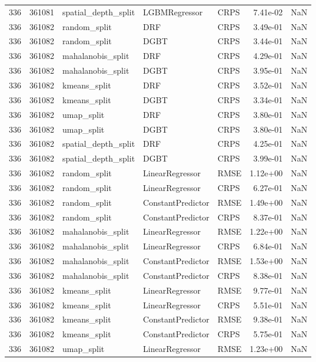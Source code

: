 \begin{tabular}{rrlllrr}
336 & 361081 & spatial\_depth\_split & LGBMRegressor & CRPS & 7.41e-02 & NaN \\
336 & 361082 & random\_split & DRF & CRPS & 3.49e-01 & NaN \\
336 & 361082 & random\_split & DGBT & CRPS & 3.44e-01 & NaN \\
336 & 361082 & mahalanobis\_split & DRF & CRPS & 4.29e-01 & NaN \\
336 & 361082 & mahalanobis\_split & DGBT & CRPS & 3.95e-01 & NaN \\
336 & 361082 & kmeans\_split & DRF & CRPS & 3.52e-01 & NaN \\
336 & 361082 & kmeans\_split & DGBT & CRPS & 3.34e-01 & NaN \\
336 & 361082 & umap\_split & DRF & CRPS & 3.80e-01 & NaN \\
336 & 361082 & umap\_split & DGBT & CRPS & 3.80e-01 & NaN \\
336 & 361082 & spatial\_depth\_split & DRF & CRPS & 4.25e-01 & NaN \\
336 & 361082 & spatial\_depth\_split & DGBT & CRPS & 3.99e-01 & NaN \\
336 & 361082 & random\_split & LinearRegressor & RMSE & 1.12e+00 & NaN \\
336 & 361082 & random\_split & LinearRegressor & CRPS & 6.27e-01 & NaN \\
336 & 361082 & random\_split & ConstantPredictor & RMSE & 1.49e+00 & NaN \\
336 & 361082 & random\_split & ConstantPredictor & CRPS & 8.37e-01 & NaN \\
336 & 361082 & mahalanobis\_split & LinearRegressor & RMSE & 1.22e+00 & NaN \\
336 & 361082 & mahalanobis\_split & LinearRegressor & CRPS & 6.84e-01 & NaN \\
336 & 361082 & mahalanobis\_split & ConstantPredictor & RMSE & 1.53e+00 & NaN \\
336 & 361082 & mahalanobis\_split & ConstantPredictor & CRPS & 8.38e-01 & NaN \\
336 & 361082 & kmeans\_split & LinearRegressor & RMSE & 9.77e-01 & NaN \\
336 & 361082 & kmeans\_split & LinearRegressor & CRPS & 5.51e-01 & NaN \\
336 & 361082 & kmeans\_split & ConstantPredictor & RMSE & 9.38e-01 & NaN \\
336 & 361082 & kmeans\_split & ConstantPredictor & CRPS & 5.75e-01 & NaN \\
336 & 361082 & umap\_split & LinearRegressor & RMSE & 1.23e+00 & NaN \\

\end{tabular}
